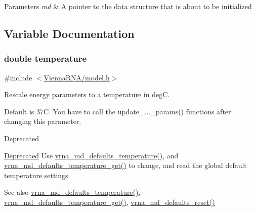 \begin{DoxyParams}{Parameters}
{\em md} & A pointer to the data structure that is about to be initialized \\
\hline
\end{DoxyParams}


\subsection{Variable Documentation}
\subsubsection[{\texorpdfstring{temperature}{temperature}}]{\setlength{\rightskip}{0pt plus 5cm}double temperature}\hypertarget{group__model__details_gab4b11c8d9c758430960896bc3fe82ead}{}\label{group__model__details_gab4b11c8d9c758430960896bc3fe82ead}


{\ttfamily \#include $<$\hyperlink{model_8h}{Vienna\+R\+N\+A/model.\+h}$>$}



Rescale energy parameters to a temperature in degC. 

Default is 37C. You have to call the update\+\_\+...\+\_\+params() functions after changing this parameter. \begin{DoxyRefDesc}{Deprecated}
\item[\hyperlink{deprecated__deprecated000088}{Deprecated}]Use \hyperlink{group__model__details_gaf9e527e9a2f7e6fd6e42bc6e602f5445}{vrna\+\_\+md\+\_\+defaults\+\_\+temperature()}, and \hyperlink{group__model__details_ga96b24a74437f9ba46c4e06343155bf46}{vrna\+\_\+md\+\_\+defaults\+\_\+temperature\+\_\+get()} to change, and read the global default temperature settings \end{DoxyRefDesc}
\begin{DoxySeeAlso}{See also}
\hyperlink{group__model__details_gaf9e527e9a2f7e6fd6e42bc6e602f5445}{vrna\+\_\+md\+\_\+defaults\+\_\+temperature()}, \hyperlink{group__model__details_ga96b24a74437f9ba46c4e06343155bf46}{vrna\+\_\+md\+\_\+defaults\+\_\+temperature\+\_\+get()}, \hyperlink{group__model__details_ga70834424cf804d149937de89f80ceb45}{vrna\+\_\+md\+\_\+defaults\+\_\+reset()} 
\end{DoxySeeAlso}
